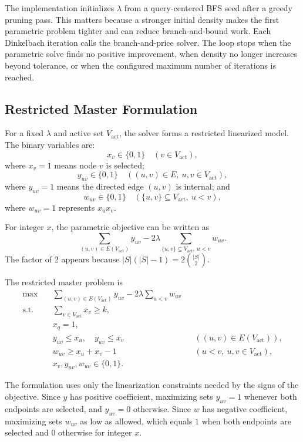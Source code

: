 \documentclass[11pt]{article}
\newcommand{\Vactive}{V_{\mathrm{act}}}
\begin{document}
The implementation initializes $\lambda$ from a query-centered BFS seed after a
greedy pruning pass. This matters because a stronger initial density makes the
first parametric problem tighter and can reduce branch-and-bound work. Each
Dinkelbach iteration calls the branch-and-price solver. The loop stops when the
parametric solve finds no positive improvement, when density no longer
increases beyond tolerance, or when the configured maximum number of iterations
is reached.

\subsection{Restricted Master Formulation}

For a fixed $\lambda$ and active set $\Vactive$, the solver forms a restricted
linearized model. The binary variables are:
\[
  x_v \in \{0,1\}\quad(v\in \Vactive),
\]
where $x_v=1$ means node $v$ is selected;
\[
  y_{uv}\in \{0,1\}\quad((u,v)\in E,\ u,v\in \Vactive),
\]
where $y_{uv}=1$ means the directed edge $(u,v)$ is internal; and
\[
  w_{uv}\in \{0,1\}\quad(\{u,v\}\subseteq \Vactive,\ u<v),
\]
where $w_{uv}=1$ represents $x_u x_v$.

For integer $x$, the parametric objective can be written as
\begin{equation}
  \sum_{(u,v)\in E(\Vactive)} y_{uv}
  - 2\lambda \sum_{\{u,v\}\subseteq \Vactive,\ u<v} w_{uv}.
  \label{eq:rmp-obj}
\end{equation}
The factor of 2 appears because
$|S|(|S|-1)=2\binom{|S|}{2}$.

The restricted master problem is
\begin{align}
  \max \quad &
  \sum_{(u,v)\in E(\Vactive)} y_{uv}
  -2\lambda\sum_{u<v}w_{uv}
  \label{eq:rmp}\\
  \text{s.t.}\quad
  & \sum_{v\in\Vactive} x_v \geq k, \nonumber\\
  & x_q = 1, \nonumber\\
  & y_{uv} \leq x_u,\quad y_{uv}\leq x_v
    && ((u,v)\in E(\Vactive)), \nonumber\\
  & w_{uv} \geq x_u+x_v-1
    && (u<v,\ u,v\in\Vactive), \nonumber\\
  & x_v,y_{uv},w_{uv}\in\{0,1\}. \nonumber
\end{align}

The formulation uses only the linearization constraints needed by the signs of
the objective. Since $y$ has positive coefficient, maximizing sets $y_{uv}=1$
whenever both endpoints are selected, and $y_{uv}=0$ otherwise. Since $w$ has
negative coefficient, maximizing sets $w_{uv}$ as low as allowed, which equals
$1$ when both endpoints are selected and $0$ otherwise for integer $x$.
\end{document}

